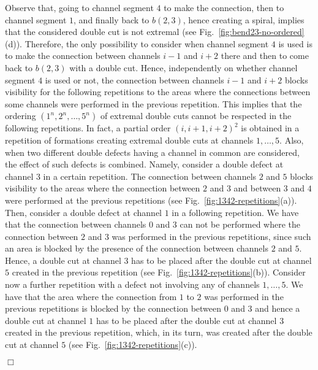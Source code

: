 \documentclass[a4paper,10pt]{llncs}
\renewenvironment{proof}
{{\bf Proof:}}{\hspace*{\fill}$\Box$\par\vspace{2mm}}
\begin{document}
\begin{proof}
Observe that, going to channel segment $4$ to make the connection, then to channel segment $1$, and finally back to $b(2,3)$, hence creating a spiral, implies that the considered double cut is not extremal (see Fig.~\ref{fig:bend23-no-ordered}(d)). Therefore, the only possibility to consider when channel segment $4$ is used is to make the connection between channels $i-1$ and $i+2$ there and then to come back to $b(2,3)$ with a double cut. Hence, independently on whether channel segment $4$ is used or not, the connection between channels $i-1$ and $i+2$ blocks visibility for the following repetitions to the areas where the connections between some channels were performed in the previous repetition. This implies that the ordering $(1^n,2^n,\ldots ,5^n)$ of extremal double cuts cannot be respected in the following repetitions. In fact, a partial order $(i,i+1,i+2)^2$ is obtained in a repetition of formations creating extremal double cuts at channels $1, \dots, 5$. Also, when two different double defects having a channel in common are considered, the effect of such defects is combined. Namely, consider a double defect at channel $3$ in a certain repetition. The connection between channels $2$ and $5$ blocks visibility to the areas where the connection between $2$ and $3$ and between $3$ and $4$ were performed at the previous repetitions (see Fig.~\ref{fig:1342-repetitions}(a)). Then, consider a double defect at channel $1$ in a following repetition. We have that the connection between channels $0$ and $3$ can not be performed where the connection between $2$ and $3$ was performed in the previous repetitions, since such an area is blocked by the presence of the connection between channels $2$ and $5$. Hence, a double cut at channel $3$ has to be placed after the double cut at channel $5$ created in the previous repetition (see Fig.~\ref{fig:1342-repetitions}(b)). Consider now a further repetition with a defect not involving any of channels $1,\dots,5$. We have that the area where the connection from $1$ to $2$ was performed in the previous repetitions is blocked by the connection between $0$ and $3$ and hence a double cut at channel $1$ has to be placed after the double cut at channel $3$ created in the previous repetition, which, in its turn, was created after the double cut at channel $5$ (see Fig.~\ref{fig:1342-repetitions}(c)).

\clearpage


\end{proof}
\end{document}
